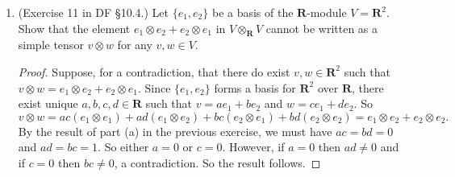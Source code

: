 \documentclass[10pt]{article}
\newcommand{\Z}{\mathbf{Z}}
\newcommand{\R}{\mathbf{R}}
\renewcommand{\bar}{\overline}
\begin{document}
\begin{enumerate}
\begin{proof}
Since the representation of $0$ as $\sum_{i=1}^n m_i \otimes e_i$ is unique with respect to the sequence $m_1, \dots, m_n$, and we know that $\sum_{i=1}^n 0 \otimes e_i = 0$, we must have $m_1 = \cdots = m_n = 0$ if $\sum_{i=1}^n m_i \otimes e_i = 0$.
\end{proof}

(b) Show that if $f_1,\ldots,f_n \in N$ are merely $R$-linearly independent elements (but do not form a basis for $N$ over $R$), then it is not necessarily true that $\sum_{i=1}^n m_i \otimes f_i = 0$ implies $m_1=\ldots=m_n=0$.  (Hint: Consider $R = \mathbf{Z}$, $n=1$, $M = \mathbf{Z}/2\mathbf{Z}$, and the element $\overline{1} \otimes 2$.)

\begin{proof}
Let $R = \Z$, $n=1$, and $M = \Z / 2\Z$.  We have
$$
\bar{1} \otimes 2 = \bar{1}(2) \otimes 1 = \bar{2} \otimes 1 = 0 \otimes 1 = 0
$$
However, $\bar{1}$ is nonzero in $(\Z / 2\Z) \otimes_{\Z} \Z$.  Clearly, $2$ is linearly independent in $\Z$ because $z\cdot 2 = 0$ implies $z = 0$.
\end{proof}

\item (Exercise 11 in DF \S 10.4.) Let $\{e_1,e_2\}$ be a basis of the $\mathbf{R}$-module $V = \mathbf{R}^2$.  Show that the element $e_1 \otimes e_2 + e_2 \otimes e_1$ in $V \otimes_\mathbf{R} V$ cannot be written as a simple tensor $v \otimes w$ for any $v,w \in V$.

\begin{proof}
Suppose, for a contradiction, that there do exist $v,w \in \R^2$ such that $v \otimes w = e_1 \otimes e_2 + e_2 \otimes e_1$.  Since $\{e_1, e_2\}$ forms a basis for $\R^2$ over $\R$, there exist unique $a,b,c,d \in \R$ such that $v = ae_1 + be_2$ and $w = ce_1 + de_2$.  So
$$
v \otimes w
= ac (e_1 \otimes e_1) + ad (e_1 \otimes e_2) + bc (e_2 \otimes e_1) + bd (e_2 \otimes e_2)
=
e_1 \otimes e_2 + e_2 \otimes e_2.
$$
By the result of part (a) in the previous exercise, we must have $ac = bd = 0$ and $ad = bc = 1$.  So either $a=0$ or $c=0$.  However, if $a=0$ then $ad \neq 0$ and if $c = 0$ then $bc \neq 0$, a contradiction.  So the result follows.
\end{proof}



\end{enumerate}
\end{document}
